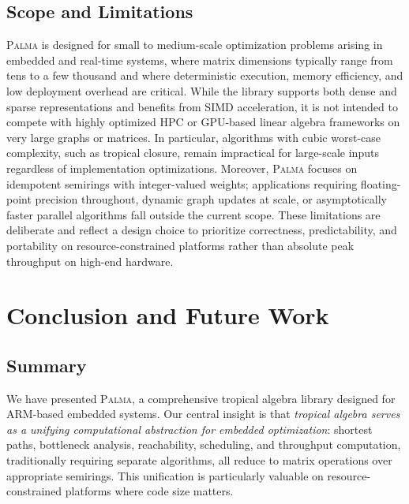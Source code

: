 \documentclass[11pt,a4paper]{article}
\theoremstyle{plain}
\theoremstyle{definition}
\newcommand{\palma}{\textsc{Palma}}
\begin{document}
\subsection{Scope and Limitations}

\palma{} is designed for small to medium-scale optimization problems arising in embedded and real-time systems, where matrix dimensions typically range from tens to a few thousand and where deterministic execution, memory efficiency, and low deployment overhead are critical. While the library supports both dense and sparse representations and benefits from SIMD acceleration, it is not intended to compete with highly optimized HPC or GPU-based linear algebra frameworks on very large graphs or matrices. In particular, algorithms with cubic worst-case complexity, such as tropical closure, remain impractical for large-scale inputs regardless of implementation optimizations. Moreover, \palma{} focuses on idempotent semirings with integer-valued weights; applications requiring floating-point precision throughout, dynamic graph updates at scale, or asymptotically faster parallel algorithms fall outside the current scope. These limitations are deliberate and reflect a design choice to prioritize correctness, predictability, and portability on resource-constrained platforms rather than absolute peak throughput on high-end hardware.

\section{Conclusion and Future Work}
\label{sec:conclusion}

\subsection{Summary}

We have presented \palma{}, a comprehensive tropical algebra library designed for ARM-based embedded systems. Our central insight is that \emph{tropical algebra serves as a unifying computational abstraction for embedded optimization}: shortest paths, bottleneck analysis, reachability, scheduling, and throughput computation, traditionally requiring separate algorithms, all reduce to matrix operations over appropriate semirings. This unification is particularly valuable on resource-constrained platforms where code size matters.
\end{document}
